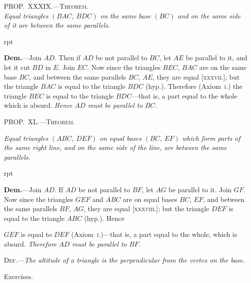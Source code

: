\documentclass[oneside]{book}
\newcounter{wrapwidth}
\newcommand\myprop[2]{
\bigskip\Needspace*{4\baselineskip}\begin{center}\textsc{#1}\\\medskip\emph{#2}\par\end{center}
}
\newcommand\mypropl[2]{
\bigskip\Needspace*{4\baselineskip}\begin{center}\textsc{#1}\end{center}
\hspace{\parindent}\emph{#2}\par\medskip
}
\newcommand\exhead[1]{
\Needspace*{5\baselineskip}\begin{center}
\textsf{#1}
\end{center}
}
\newcommand\imgflow[3]{
\setcounter{wrapwidth}{#1}

\begin{wrapfigure}[#2]{r}{\value{wrapwidth}pt}
\begin{center}
\vspace{-0.3in}

\end{center}
\end{wrapfigure}
}
\begin{document}
\myprop{PROP\@.~XXXIX\@.---Theorem.}{Equal triangles $(BAC,\ BDC)$ on the same base $(BC)$ and
on the same side of it are between the same parallels.}


\imgflow{128}{8}{f059}

\textbf{Dem.}---Join $AD$. Then if $AD$ be not parallel to $BC$,
let $AE$ be parallel to it, and
let it cut $BD$ in $E$. Join $EC$.
Now since the triangles $BEC$,
$BAC$ are on the same base $BC$,
and between the same parallels
$BC$, $AE$, they are equal [\textsc{xxxvii}.];
but the triangle $BAC$ is equal
to the triangle $BDC$ (hyp.).
Therefore (Axiom~\textsc{i}.) the triangle $BEC$ is equal to
the triangle $BDC$---that is, a part equal to the whole
which is absurd. \emph{Hence $AD$ must be parallel to $BC$.}


\mypropl{PROP\@.~XL\@.---Theorem.}{Equal triangles $(ABC,\ DEF)$ on equal bases $(BC,\ EF)$
which form parts of the same right line, and on the same
side of the line, are between the same parallels.}


\imgflow{170}{7}{f060}

\textbf{Dem.}---Join $AD$. If $AD$ be not parallel to $BF$, let
$AG$ be parallel to it.
Join $GF$. Now since
the triangles $GEF$ and
$ABC$ are on equal bases
$BC$, $EF$, and between
the same parallels $BF$,
$AG$, they are equal
[\textsc{xxxviii}.]; but the triangle
$DEF$ is equal to the triangle $ABC$ (hyp.). Hence

$GEF$ is equal to $DEF$ (Axiom~\textsc{i}.)---that is, a part equal
to the whole, which is absurd. \emph{Therefore $AD$ must be
parallel to $BF$.}\par\medskip

\textsc{Def}.---\emph{The altitude of a triangle is the perpendicular
from the vertex on the base.}


\exhead{Exercises.}
\end{document}
